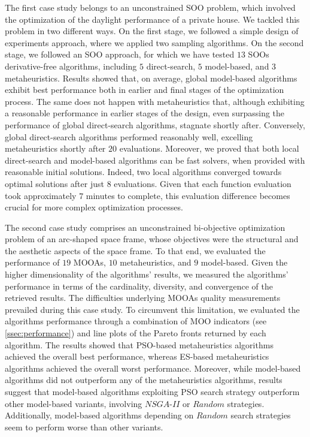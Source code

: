 The first case study belongs to an unconstrained \ac{SOO} problem, which involved the optimization of the daylight performance of a private house. We tackled this problem in two different ways. On the first stage, we followed a simple design of experiments approach, where we applied two sampling algorithms. On the second stage, we followed an \ac{SOO} approach, for which we have tested $13$ \acp{SOO} derivative-free algorithms, including $5$ direct-search, $5$ model-based, and $3$ metaheuristics. Results showed that, on average, global model-based algorithms exhibit best performance both in earlier and final stages of the optimization process. The same does not happen with metaheuristics that, although exhibiting a reasonable performance in earlier stages of the design, even surpassing the performance of global direct-search algorithms, stagnate shortly after. Conversely, global direct-search algorithms performed reasonably well, excelling metaheuristics shortly after $20$ evaluations. Moreover, we proved that both local direct-search and model-based algorithms can be fast solvers, when provided with reasonable initial solutions. Indeed, two local algorithms converged towards optimal solutions after just $8$ evaluations. Given that each function evaluation took approximately $7$ minutes to complete, this evaluation difference becomes crucial for more complex optimization processes.

The second case study comprises an unconstrained bi-objective optimization problem of an arc-shaped space frame, whose objectives were the structural and the aesthetic aspects of the space frame. To that end, we evaluated the performance of $19$ \acp{MOOA}, $10$ metaheuristics, and $9$ model-based. Given the higher dimensionality of the algorithms' results, we measured the algorithms' performance in terms of the cardinality, diversity, and convergence of the retrieved results. The difficulties underlying \acp{MOOA} quality measurements prevailed during this case study. To circumvent this limitation, we evaluated the algorithms performance through a combination of \ac{MOO} indicators (see \cref{ssec:performance}) and line plots of the Pareto fronts returned by each algorithm. The results showed that \ac{PSO}-based metaheuristics algorithms achieved the overall best performance, whereas \ac{ES}-based metaheuristics algorithms achieved the overall worst performance. Moreover, while model-based algorithms did not outperform any of the metaheuristics algorithms, results suggest that model-based algorithms exploiting \ac{PSO} search strategy outperform other model-based variants, involving $NSGA$-$II$ or $Random$ strategies. Additionally, model-based algorithms depending on $Random$ search strategies seem to perform worse than other variants. 

